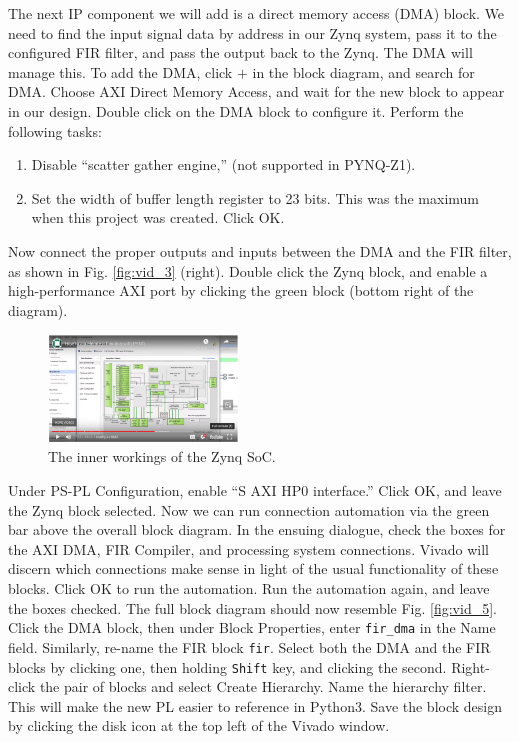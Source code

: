 \documentclass{article}
\begin{document}
\noindent
The next IP component we will add is a direct memory access (DMA) block.  We need to find the input signal data by address in our Zynq system, pass it to the configured FIR filter, and pass the output back to the Zynq.  The DMA will manage this.  To add the DMA, click $+$ in the block diagram, and search for DMA.  Choose AXI Direct Memory Access, and wait for the new block to appear in our design.  Double click on the DMA block to configure it.  Perform the following tasks:

\begin{enumerate}
\item Disable ``scatter gather engine,'' (not supported in PYNQ-Z1).
\item Set the width of buffer length register to 23 bits.  This was the maximum when this project was created.  Click OK.
\end{enumerate}

\noindent
Now connect the proper outputs and inputs between the DMA and the FIR filter, as shown in Fig. \ref{fig:vid_3} (right).  Double click the Zynq block, and enable a high-performance AXI port by clicking the green block (bottom right of the diagram).

\begin{figure}[hb]
\centering
\includegraphics[width=0.45\textwidth]{fir_video_5.png}
\caption{\label{fig:vid_4} The inner workings of the Zynq SoC.}
\end{figure}

\clearpage

\noindent
Under PS-PL Configuration, enable ``S AXI HP0 interface.''  Click OK, and leave the Zynq block selected.  Now we can run connection automation via the green bar above the overall block diagram.  In the ensuing dialogue, check the boxes for the AXI DMA, FIR Compiler, and processing system connections.  Vivado will discern which connections make sense in light of the usual functionality of these blocks.  Click OK to run the automation.  Run the automation again, and leave the boxes checked.  The full block diagram should now resemble Fig. \ref{fig:vid_5}.  Click the DMA block, then under Block Properties, enter \verb+fir_dma+ in the Name field.  Similarly, re-name the FIR block \verb+fir+.  Select both the DMA and the FIR blocks by clicking one, then holding \verb+Shift+ key, and clicking the second.  Right-click the pair of blocks and select Create Hierarchy.  Name the hierarchy filter.  This will make the new PL easier to reference in Python3.  Save the block design by clicking the disk icon at the top left of the Vivado window.
\end{document}

